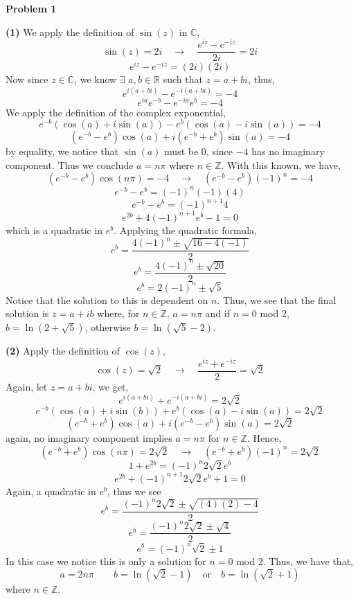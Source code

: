 \documentclass[10pt]{article}
\newcommand{\Z}{\mathbb{Z}}
\newcommand{\R}{\mathbb{R}}
\newcommand{\C}{\mathbb{C}}
\begin{document}
\textbf{Problem 1}

\textbf{(1)}
We apply the definition of $\sin(z)$ in $\C$,
$$\sin(z) = 2i \hspace{1em} \to \hspace{1em} \frac{e^{iz}-e^{-iz}}{2i} = 2i$$
$$e^{iz}-e^{-iz} = (2i)(2i)$$
Now since $z\in \C$, we know $\exists$ $a,b\in\R$ such that $z = a+bi$, thus,
$$e^{i(a + bi)} - e^{-i(a+bi)} = -4$$
$$e^{ia}e^{-b} - e^{-ia}e^{b} = -4$$
We apply the definition of the complex exponential,
$$e^{-b}(\cos(a) + i\sin(a)) - e^{b}(\cos(a) - i\sin(a)) = -4$$
$$\left(e^{-b}-e^{b}\right)\cos(a) + i\left(e^{-b} + e^{b}\right)\sin(a) = -4$$
by equality, we notice that $\sin(a)$ must be $0$, since $-4$ has no imaginary component. Thus we conclude $a = n\pi$ where $n \in \Z$. With this known, we have,
$$\left(e^{-b}-e^{b}\right)\cos(n\pi) = -4 \hspace{1em} \to \hspace{1em}\left(e^{-b}-e^{b}\right)(-1)^{n} = -4$$
$$e^{-b} - e^{b} = (-1)^{n}(-1)(4)$$
$$e^{-b} - e^{b} = (-1)^{n+1}4$$
$$e^{2b} + 4(-1)^{n+1}e^{b} - 1 = 0$$
which is a quadratic in $e^{b}$. Applying the quadratic formula,
$$e^{b} = \frac{4(-1)^{n} \pm \sqrt{16 - 4(-1)}}{2}$$
$$e^{b} = \frac{4(-1)^{n} \pm \sqrt{20}}{2}$$
$$e^{b} = 2(-1)^{n} \pm \sqrt{5}$$
Notice that the solution to this is dependent on $n$. Thus, we see that the final solution is $z = a+ib$ where, for $n\in \Z$, $a = n\pi$ and if $n = 0$ mod $2$, $b = \ln(2 + \sqrt{5})$, otherwise $b = \ln(\sqrt{5} - 2)$.

\newpage
\textbf{(2)}
Apply the definition of $\cos(z)$,
$$\cos(z) = \sqrt{2} \hspace{1em} \to \hspace{1em} \frac{e^{iz} + e^{-iz}}{2} = \sqrt{2}$$
Again, let $z = a+bi$, we get,
$$e^{i(a+bi)} + e^{-i(a+bi)} = 2\sqrt{2}$$
$$e^{-b}(\cos(a) + i\sin(b)) + e^{b}(\cos(a) - i\sin(a)) = 2\sqrt{2}$$
$$\left(e^{-b} + e^{b}\right)\cos(a) + i\left(e^{-b} - e^{b}\right)\sin(a) = 2\sqrt{2}$$
again, no imaginary component implies $a = n\pi$ for $n \in \Z$. Hence,
$$\left(e^{-b}+e^{b}\right)\cos(n\pi) = 2\sqrt{2} \hspace{1em} \to \hspace{1em} \left(e^{-b}+e^{b}\right)(-1)^{n} = 2\sqrt{2} $$
$$1 + e^{2b} = (-1)^{n}2\sqrt{2}e^{b}$$
$$e^{2b} + (-1)^{n+1}2\sqrt{2}e^{b} + 1 = 0$$
Again, a quadratic in $e^{b}$, thus we see
$$e^{b} = \frac{(-1)^{n}2\sqrt{2} \pm \sqrt{(4)(2) - 4}}{2}$$
$$e^{b} = \frac{(-1)^{n}2\sqrt{2} \pm \sqrt{4}}{2}$$
$$e^{b} = (-1)^{n}\sqrt{2} \pm 1$$
In this case we notice this is only a solution for $n=0$ mod $2$. Thus, we have that,
$$a = 2n\pi \hspace{2em} b = \ln(\sqrt{2} - 1) \hspace{1em} \text{or} \hspace{1em} b = \ln(\sqrt{2} + 1)$$
where $n \in \Z$.
\end{document}
